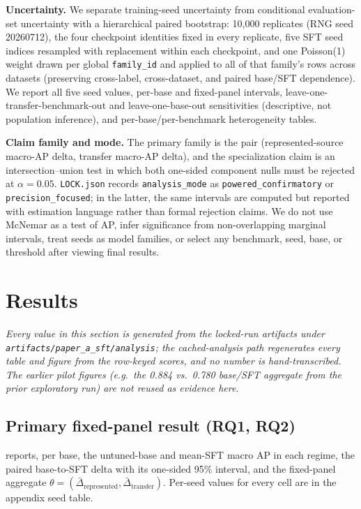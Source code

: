 \documentclass[sigconf,nonacm]{acmart}
\begin{document}
\textbf{Uncertainty.} We separate training-seed uncertainty from conditional evaluation-set uncertainty with a hierarchical paired bootstrap: 10{,}000 replicates (RNG seed 20260712), the four checkpoint identities fixed in every replicate, five SFT seed indices resampled with replacement within each checkpoint, and one Poisson(1) weight drawn per global \texttt{family\_id} and applied to all of that family's rows across datasets (preserving cross-label, cross-dataset, and paired base/SFT dependence). We report all five seed values, per-base and fixed-panel intervals, leave-one-transfer-benchmark-out and leave-one-base-out sensitivities (descriptive, not population inference), and per-base/per-benchmark heterogeneity tables.

\textbf{Claim family and mode.} The primary family is the pair (represented-source macro-AP delta, transfer macro-AP delta), and the specialization claim is an intersection--union test in which both one-sided component nulls must be rejected at $\alpha{=}0.05$. \texttt{LOCK.json} records \texttt{analysis\_mode} as \texttt{powered\_confirmatory} or \texttt{precision\_focused}; in the latter, the same intervals are computed but reported with estimation language rather than formal rejection claims. We do not use McNemar as a test of AP, infer significance from non-overlapping marginal intervals, treat seeds as model families, or select any benchmark, seed, base, or threshold after viewing final results.

\section{Results}
\label{sec:results}

\emph{Every value in this section is generated from the locked-run artifacts under \texttt{artifacts/paper\_a\_sft/analysis}; the cached-analysis path regenerates every table and figure from the row-keyed scores, and no number is hand-transcribed. The earlier pilot figures (e.g.\ the 0.884 vs.\ 0.780 base/SFT aggregate from the prior exploratory run) are not reused as evidence here.}

\subsection{Primary fixed-panel result (RQ1, RQ2)}
\label{subsec:primary}

 reports, per base, the untuned-base and mean-SFT macro AP in each regime, the paired base-to-SFT delta with its one-sided 95\% interval, and the fixed-panel aggregate $\theta = (\bar\Delta_{\text{represented}}, \bar\Delta_{\text{transfer}})$. Per-seed values for every cell are in the appendix seed table.
\end{document}
